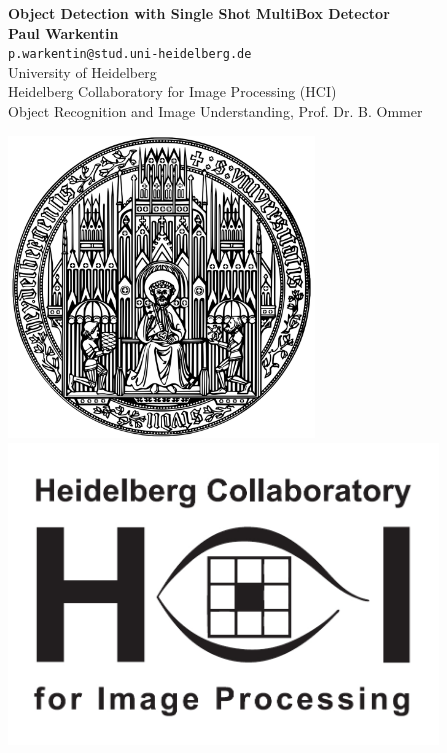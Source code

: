 \documentclass[a0, portrait]{a0poster}
\begin{document}

\begin{minipage}[b]{0.75\linewidth}
  \VeryHuge \color{NavyBlue} \textbf{Object Detection with Single Shot MultiBox Detector} \color{Black} \\[3cm]
  \huge \textbf{Paul Warkentin} \\[-0.3cm]
  \Large \texttt{p.warkentin@stud.uni-heidelberg.de} \\[0.5cm]
  \huge University of Heidelberg \\
  \huge Heidelberg Collaboratory for Image Processing (HCI) \\
  \huge Object Recognition and Image Understanding, Prof. Dr. B. Ommer \\%
\end{minipage} %
\begin{minipage}[b]{0.25\linewidth}
  \hspace{-3cm}
  \includegraphics[height=8cm]{logo_hd.png}
  \hspace{1cm}
  \includegraphics[height=8cm]{logo_hci.png} \\
\end{minipage}
\end{document}
